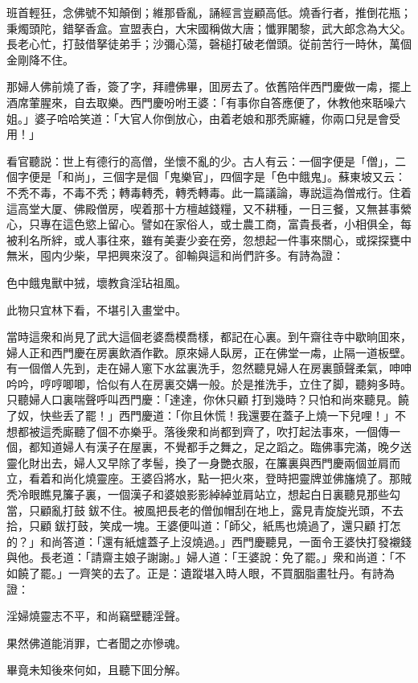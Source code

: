 \begin{myquote}
班首輕狂，念佛號不知顛倒；維那昏亂，誦經言豈顧高低。燒香行者，推倒花瓶；秉燭頭陀，錯拏香盒。宣盟表白，大宋國稱做大唐；懺罪闍黎，武大郎念為大父。長老心忙，打鼓借拏徒弟手；沙彌心蕩，磬槌打破老僧頭。従前苦行一時休，萬個金剛降不住。
\end{myquote}

那婦人佛前燒了香，簽了字，拜禮佛畢，囬房去了。依舊陪伴西門慶做一䖏，擺上酒席葷腥來，自去取樂。西門慶吩咐王婆：「有事你自答應便了，休教他來聒噪六姐。」婆子哈哈笑道：「大官人你倒放心，由着老娘和那秃廝纏，你兩口兒是會受用！」

看官聽説：世上有德行的高僧，坐懷不亂的少。古人有云：一個字便是「僧」，二個字便是「和尚」，三個字是個「鬼樂官」，四個字是「色中餓鬼」。蘇東坡又云：不秃不毒，不毒不秃；轉毒轉秃，轉秃轉毒。此一篇議論，專説這為僧戒行。住着這高堂大厦、佛殿僧房，喫着那十方檀越錢糧，又不耕種，一日三餐，又無甚事縈心，只專在這色慾上留心。譬如在家俗人，或士農工商，富貴長者，小相俱全，每被利名所絆，或人事往來，雖有美妻少妾在旁，忽想起一件事來關心，或探探甕中無米，囤内少柴，早把興來沒了。卻輸與這和尚們許多。有詩為證：
\begin{myquote}
色中餓鬼獸中狨，壞教貪淫玷祖風。

此物只宜林下看，不堪引入畫堂中。
\end{myquote}

當時這衆和尚見了武大這個老婆喬模喬樣，都記在心裏。到午齋往寺中歇晌囬來，婦人正和西門慶在房裏飲酒作歡。原來婦人臥房，正在佛堂一䖏，止隔一道板壁。有一個僧人先到，走在婦人窻下水盆裏洗手，忽然聽見婦人在房裏顫聲柔氣，呻呻吟吟，哼哼唧唧，恰似有人在房裏交媾一般。於是推洗手，立住了脚，聽夠多時。只聽婦人口裏喘聲呼叫西門慶：「達達，你休只顧𢵞打到幾時？只怕和尚來聽見。饒了奴，快些丢了罷！」西門慶道：「你且休慌！我還要在蓋子上燒一下兒哩！」不想都被這秃廝聽了個不亦樂乎。落後衆和尚都到齊了，吹打起法事來，一個傳一個，都知道婦人有漢子在屋裏，不覺都手之舞之，足之蹈之。臨佛事完滿，晚夕送靈化財出去，婦人又早除了孝髻，換了一身艷衣服，在簾裏與西門慶兩個並肩而立，看着和尚化燒靈座。王婆舀將水，點一把火來，登時把靈牌並佛旛燒了。那賊秃冷眼瞧見簾子裏，一個漢子和婆娘影影綽綽並肩站立，想起白日裏聽見那些勾當，只顧亂打鼓𢵞鈸不住。被風把長老的僧伽帽刮在地上，露見青旋旋光頭，不去拾，只顧𢵞鈸打鼓，笑成一塊。王婆便叫道：「師父，紙馬也燒過了，還只顧𢵞打怎的？」和尚答道：「還有紙爐蓋子上沒燒過。」西門慶聽見，一面令王婆快打發襯錢與他。長老道：「請齋主娘子謝謝。」婦人道：「王婆說：免了罷。」衆和尚道：「不如饒了罷。」一齊笑的去了。正是：遺蹤堪入時人眼，不買胭脂畫牡丹。有詩為證：
\begin{myquote}
淫婦燒靈志不平，和尚竊壁聽淫聲。

果然佛道能消罪，亡者聞之亦慘魂。
\end{myquote}

畢竟未知後來何如，且聽下囬分解。

